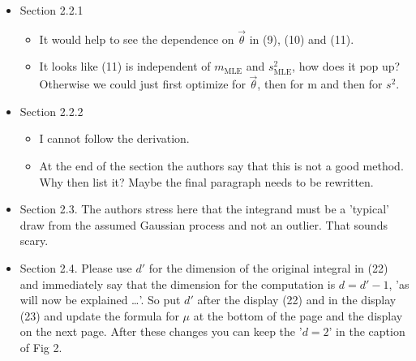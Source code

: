 \documentclass{amsart}
\begin{document}
\begin{itemize}
\item Section 2.2.1
\begin{itemize}
\item It would help to see the dependence on $\vec{\theta}$ in (9), (10) and (11). 
\item It looks like (11) is independent of $m_{\text{MLE}}$ and $s^2_{\text{MLE}}$, how does it pop up?
Otherwise we could just first optimize for $\vec{\theta}$, then for m and then
for $s^2$. 
\end{itemize}

\item Section 2.2.2
\begin{itemize}
\item I cannot follow the derivation.  
\item At the end of the section the authors say that this is not a good method.
Why then list it? Maybe the final paragraph needs to be rewritten.  
\end{itemize}

\item Section 2.3. The authors stress here that the integrand must be a 'typical' draw from the assumed Gaussian process and not an outlier. That sounds scary. 

\item Section 2.4. Please use $d'$ for the dimension of the original integral in (22) and
immediately say that the dimension for the computation is $d = d' - 1$, 'as will
now be explained \ldots'. So put $d'$ after the display (22) and in the display (23)
and update the formula for $\mu$ at the bottom of the page and the display on the
next page. After these changes you can keep the '$d=2$' in the caption of Fig 2.  



\end{itemize}
\end{document}
